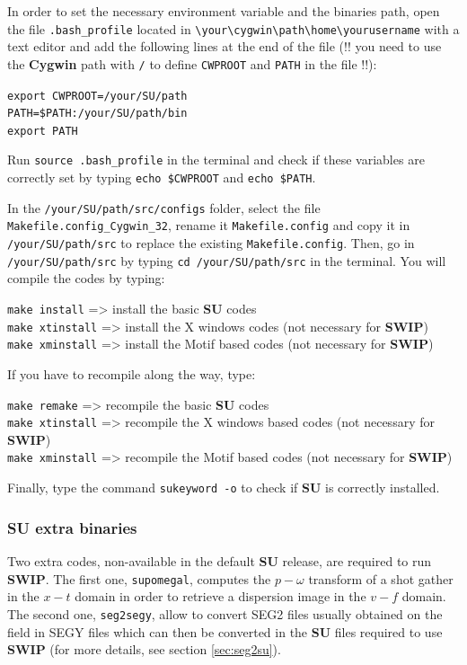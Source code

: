 \documentclass[twoside,a4paper]{article}
\def\SWIP{\textbf{SWIP}}
\def\SU{\textbf{SU}}
\def\Cygwin{\textbf{Cygwin}}
\begin{document}
In order to set the necessary environment variable and the binaries path, open the file \verb|.bash_profile| located in \verb|\your\cygwin\path\home\yourusername| with a text editor and add the following lines at the end of the file (!! you need to use the {\Cygwin} path with \verb|/| to define \verb|CWPROOT| and \verb|PATH| in the file !!):

\verb|export CWPROOT=/your/SU/path|\\
\verb|PATH=$PATH:/your/SU/path/bin|\\
\verb|export PATH|

Run \verb|source .bash_profile| in the terminal and check if these variables are correctly set by typing \verb|echo $CWPROOT| and \verb|echo $PATH|.

In the \verb|/your/SU/path/src/configs| folder, select the file \verb|Makefile.config_Cygwin_32|, rename it \verb|Makefile.config| and copy it in \verb|/your/SU/path/src| to replace the existing \verb|Makefile.config|. Then, go in \verb|/your/SU/path/src| by typing \verb|cd /your/SU/path/src| in the terminal. You will compile the codes by typing:

\verb|make install| => install the basic {\SU} codes\\
\verb|make xtinstall| => install the X windows codes (not necessary for {\SWIP})\\
\verb|make xminstall| => install the Motif based codes (not necessary for {\SWIP})

If you have to recompile along the way, type:

\verb|make remake| => recompile the basic {\SU} codes\\
\verb|make xtinstall| => recompile the X windows based codes (not necessary for {\SWIP})\\
\verb|make xminstall| => recompile the Motif based codes (not necessary for {\SWIP})

Finally, type the command \verb|sukeyword -o| to check if {\SU} is correctly installed.

\subsubsection{SU extra binaries}
Two extra codes, non-available in the default {\SU} release, are required to run {\SWIP}. The first one, \verb|supomegal|, computes the $p-\omega$ transform of a shot gather in the $x-t$ domain in order to retrieve a dispersion image in the $v-f$ domain. The second one, \verb|seg2segy|, allow to convert SEG2 files usually obtained on the field in SEGY files which can then be converted in the {\SU} files required to use {\SWIP} (for more details, see section \ref{sec:seg2su}).
\end{document}
